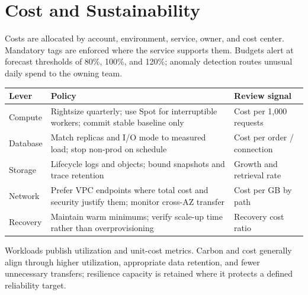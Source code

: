 \section{Cost and Sustainability}

Costs are allocated by account, environment, service, owner, and cost center. Mandatory tags are enforced where the service supports them. Budgets alert at forecast thresholds of 80\%, 100\%, and 120\%; anomaly detection routes unusual daily spend to the owning team.

\begin{tabularx}{\textwidth}{@{}L{34mm}Y L{37mm}@{}}
  \toprule
  \color{white}\textbf{Lever} & \color{white}\textbf{Policy} & \color{white}\textbf{Review signal} \\
  \midrule
  Compute & Rightsize quarterly; use Spot for interruptible workers; commit stable baseline only & Cost per 1,000 requests \\
  Database & Match replicas and I/O mode to measured load; stop non-prod on schedule & Cost per order / connection \\
  Storage & Lifecycle logs and objects; bound snapshots and trace retention & Growth and retrieval rate \\
  Network & Prefer VPC endpoints where total cost and security justify them; monitor cross-AZ transfer & Cost per GB by path \\
  Recovery & Maintain warm minimums; verify scale-up time rather than overprovisioning & Recovery cost ratio \\
  \bottomrule
\end{tabularx}

Workloads publish utilization and unit-cost metrics. Carbon and cost generally align through higher utilization, appropriate data retention, and fewer unnecessary transfers; resilience capacity is retained where it protects a defined reliability target.

